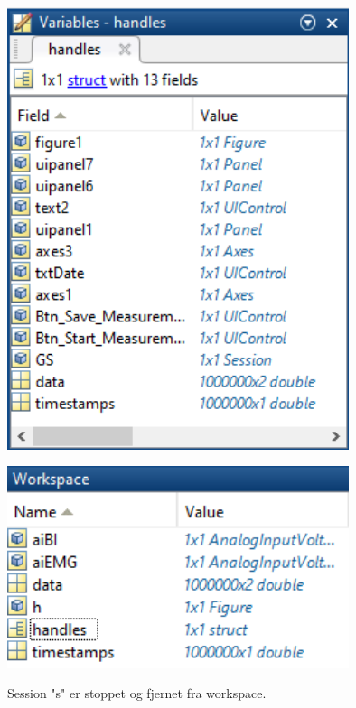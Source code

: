 \begin{figure}[H] 
\centering
{\includegraphics[width=10cm]
{Figure/modultestread7}}
\caption{}
\label{fig:modultestread6}
\end{figure}

\begin{figure}[H] 
\centering
{\includegraphics[width=10cm]
{Figure/modultestread8}}
\caption{Session "s" er stoppet og fjernet fra workspace.}
\label{fig:modultestread6}
\end{figure}





